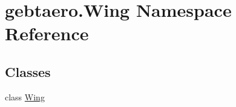 \hypertarget{namespacegebtaero_1_1_wing}{}\section{gebtaero.\+Wing Namespace Reference}
\label{namespacegebtaero_1_1_wing}
\subsection*{Classes}
\begin{DoxyCompactItemize}
\item 
class \hyperlink{classgebtaero_1_1_wing_1_1_wing}{Wing}
\end{DoxyCompactItemize}
